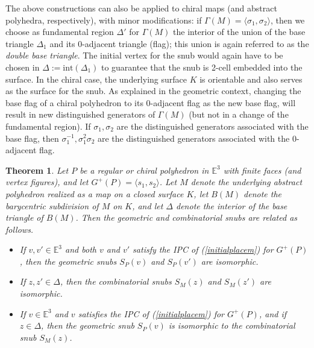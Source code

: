 \documentclass[12pt]{article}
\newtheorem{theorem}{Theorem}[section]
\theoremstyle{definition}\newtheorem{definition}{Definition}[section]
\begin{document}
The above constructions can also be applied to chiral maps (and abstract  polyhedra, respectively), with minor modifications: if $\Gamma(M) = \langle \sigma_1, \sigma_2 \rangle$, then we choose as fundamental region $\Delta'$ for $\Gamma(M)$ the interior of the union of the base triangle $\Delta_1$ and its 0-adjacent triangle (flag); this union is again referred to as the {\it double base triangle\/}. The initial vertex for the snub would again have to be chosen in $\Delta:=\text{int}(\Delta_1)$ to guarantee that the snub is 2-cell embedded into the surface. In the chiral case, the underlying surface $K$ is orientable and also serves as the surface for the snub. As explained in the geometric context, changing the base flag of a chiral polyhedron to its 0-adjacent flag as the new base flag, will result in new distinguished generators of $\Gamma(M)$ (but not in a change of the fundamental region). If $\sigma_1,\sigma_2$ are the distinguished generators associated with the base flag, then $\sigma_1^{-1},\sigma_1^2\sigma_2$ are the distinguished generators associated with the 0-adjacent flag.
\smallskip

\begin{theorem}
\label{thm: isomorphisms between wythoffians}
Let $P$ be a regular or chiral polyhedron in $\mathbb{E}^3$ with finite faces (and vertex figures), and let $G^+(P)=\langle s_1,s_2\rangle$. Let $M$ denote the underlying abstract polyhedron realized as a map on a closed surface $K$, let $B(M)$ denote the barycentric subdivision of $M$ on $K$, and let $\Delta$ denote the interior of the base triangle of $B(M)$. Then the geometric and combinatorial snubs are related as follows. 
\begin{itemize}
    \item[(a)] If $v,v'\in\mathbb{E}^3$ and both $v$ and $v'$ satisfy the IPC of (\ref{initialplacem}) for $G^+(P)$, then the geometric snubs ${S}_P(v)$ and ${S}_P(v')$ are isomorphic. 
        
    \item[(b)] If $z,z'\in\Delta$, then the combinatorial snubs ${S}_M(z)$ and ${S}_M(z')$ are isomorphic. 
        
    \item[(c)] If $v\in\mathbb{E}^3$ and $v$ satisfies the IPC of (\ref{initialplacem}) for $G^+(P)$, and if $z\in\Delta$, then the geometric snub ${S}_P(v)$ is isomorphic to the combinatorial snub ${S}_M(z)$. 
    
    \end{itemize}
\end{theorem}
\end{document}
